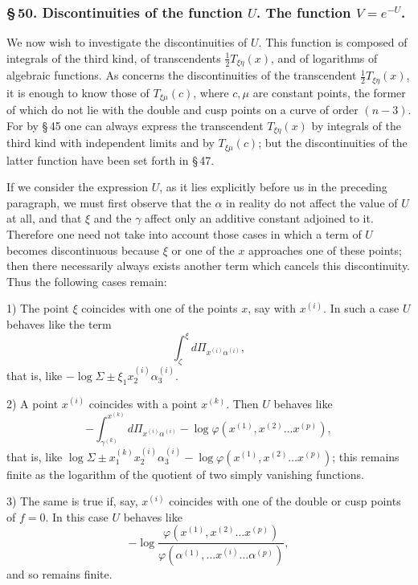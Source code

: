 \documentclass[10pt]{article}
\begin{document}
\subsubsection*{\S\,50. Discontinuities of the function \(U\). The function \(V=e^{-U}\).}

We now wish to investigate the discontinuities of \(U\). This function is composed of integrals of the third kind, of transcendents \(\frac12T_{\xi\eta}(x)\), and of logarithms of algebraic functions. As concerns the discontinuities of the transcendent \(\frac12T_{\xi\eta}(x)\), it is enough to know those of \(T_{\xi\mu}(c)\), where \(c,\mu\) are constant points, the former of which do not lie with the double and cusp points on a curve of order \((n-3)\). For by \S\,45 one can always express the transcendent \(T_{\xi\eta}(x)\) by integrals of the third kind with independent limits and by \(T_{\xi\mu}(c)\); but the discontinuities of the latter function have been set forth in \S\,47.

If we consider the expression \(U\), as it lies explicitly before us in the preceding paragraph, we must first observe that the \(\alpha\) in reality do not affect the value of \(U\) at all, and that \(\xi\) and the \(\gamma\) affect only an additive constant adjoined to it. Therefore one need not take into account those cases in which a term of \(U\) becomes discontinuous because \(\xi\) or one of the \(x\) approaches one of these points; then there necessarily always exists another term which cancels this discontinuity. Thus the following cases remain:

1) The point \(\xi\) coincides with one of the points \(x\), say with \(x^{(i)}\). In such a case \(U\) behaves like the term
\[
\int_{\zeta}^{\xi}d\Pi_{x^{(i)}\alpha^{(i)}},
\]
that is, like \(-\log\Sigma\pm\xi_1x_2^{(i)}\alpha_3^{(i)}\).

2) A point \(x^{(i)}\) coincides with a point \(x^{(k)}\). Then \(U\) behaves like
\[
-\int_{\gamma^{(k)}}^{x^{(k)}}d\Pi_{x^{(i)}\alpha^{(i)}}-\log\varphi(x^{(1)},x^{(2)}\ldots x^{(p)}),
\]
that is, like \(\log\Sigma\pm x_1^{(k)}x_2^{(i)}\alpha_3^{(i)}-\log\varphi(x^{(1)},x^{(2)}\ldots x^{(p)})\); this remains finite as the logarithm of the quotient of two simply vanishing functions.

3) The same is true if, say, \(x^{(i)}\) coincides with one of the double or cusp points of \(f=0\). In this case \(U\) behaves like
\[
-\log\frac{\varphi(x^{(1)},x^{(2)}\ldots x^{(p)})}{\varphi(\alpha^{(1)},\ldots x^{(i)}\ldots\alpha^{(p)})},
\]
and so remains finite.
\end{document}
